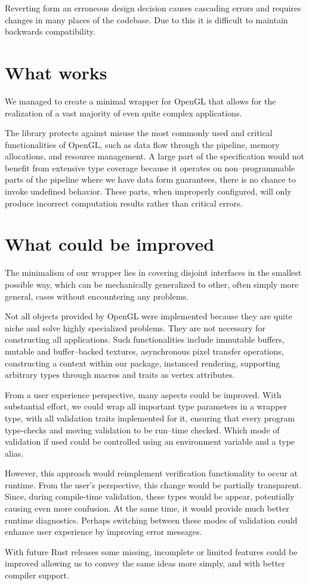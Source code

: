 Reverting form an erroneous design decision causes cascading errors and requires changes in many places of the codebase. Due to this it is difficult to maintain backwards compatibility.

\section{What works}

We managed to create a minimal wrapper for OpenGL that allows for the realization of a vast majority of even quite complex applications.

The library protects against misuse the most commonly used and critical functionalities of OpenGL, such as data flow through the pipeline, memory allocations, and resource management. 
A large part of the specification would not benefit from extensive type coverage because it operates on non--programmable parts of the pipeline where we have data form guarantees, 
there is no chance to invoke undefined behavior. These parts, when improperly configured, will only produce incorrect computation results rather than critical errors. 

\section{What could be improved}

The minimalism of our wrapper lies in covering disjoint interfaces in the smallest possible way, which can be mechanically generalized to other, often simply more general, cases without encountering any problems.

Not all objects provided by OpenGL were implemented because they are quite niche and solve highly specialized problems. 
They are not necessary for constructing all applications. 
Such functionalities include immutable buffers, mutable and buffer--backed textures, asynchronous pixel transfer operations, constructing a context within our package, instanced rendering, supporting arbitrary types through macros and traits as vertex attributes.

From a user experience perspective, many aspects could be improved.
With substantial effort, we could wrap all important type parameters in a wrapper type, with all validation traits implemented for it, ensuring that every program type-checks
and moving validation to be run--time checked. Which mode of validation if used could be controlled using an environment variable and a type alias.

However, this approach would reimplement verification functionality to occur at runtime. 
From the user's perspective, this change would be partially transparent. 
Since, during compile-time validation, these types would be appear, potentially causing even more confusion. 
At the same time, it would provide much better runtime diagnostics. 
Perhaps switching between these modes of validation could enhance user experience by improving error messages.

With future Rust releases some missing, incomplete or limited features could be improved allowing us to convey the same ideas more simply,
and with better compiler support.
